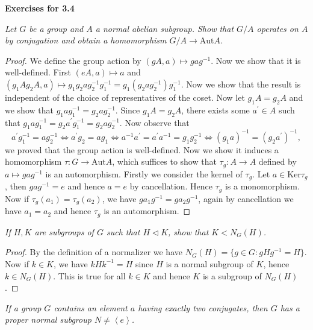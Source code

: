 \begin{center}
\begin{large}
    \textbf{Exercises for 3.4}
\end{large}
\end{center}
\begin{problem}\em
Let $G$ be a group and $A$ a normal abelian subgroup. Show that $G/A$ operates on $A$ by conjugation and obtain a homomorphism $G/A\to\mathrm{Aut}A$.
\end{problem}
\begin{proof}
We define the group action by $(gA,a)\mapsto gag^{-1}$. Now we show that it is well-defined. First $(eA,a)\mapsto a$ and $(g_1Ag_2A,a)\mapsto g_1g_2ag_2^{-1}g_1^{-1}=g_1(g_2ag_2^{-1})g_1^{-1}$. Now we show that the result is independent of the choice of representatives of the coset. Now let $g_1A=g_2A$ and we show that $g_1ag_1^{-1}=g_2ag_2^{-1}$. Since $g_1A=g_2A$, there exists some $a^\prime\in A$ such that $g_1ag_{1}^{-1}=g_2a^{\prime}g_{1}^{-1}=g_2ag_{2}^{-1}$. Now observe that 
$$
a^{\prime}g_{1}^{-1}=ag_{2}^{-1}\Leftrightarrow a^{\prime}g_2=ag_1\Leftrightarrow a^{-1}a^{\prime}=a^{\prime}a^{-1}=g_1g_{2}^{-1}\Leftrightarrow \left( g_1a \right) ^{-1}=\left( g_2a^{\prime} \right) ^{-1},
$$
we proved that the group action is well-defined. Now we show it induces a homomorphism $\tau:G\to\mathrm{Aut}A$, which suffices to show that $\tau_g:A\to A$ defined by $a\mapsto gag^{-1}$ is an automorphism. Firstly we consider the kernel of $\tau_g$. Let $a\in\mathrm{Ker}\tau_g$, then $gag^{-1}=e$ and hence $a=e$ by cancellation. Hence $\tau_g$ is a monomorphism. Now if $\tau_g(a_1)=\tau_g(a_2)$, we have $ga_1g^{-1}=ga_2g^{-1}$, again by cancellation we have $a_1=a_2$ and hence $\tau_g$ is an automorphism.
\end{proof}
\begin{problem}\em
If $H,K$ are subgroups of $G$ such that $H\lhd K$, show that $K<N_G(H)$.
\end{problem}
\begin{proof}
By the definition of a normalizer we have $N_G(H)=\{g\in G:gHg^{-1}=H\}$. Now if $k\in K$, we have $kHk^{-1}=H$ since $H$ is a normal subgroup of $K$, hence $k\in N_G(H)$. This is true for all $k\in K$ and hence $K$ is a subgroup of $N_G(H)$.
\end{proof}
\begin{problem}\em
If a group $G$ contains an element $a$ having exactly two conjugates, then $G$ has a proper normal subgroup $N\ne\left<e\right>$.
\end{problem}
